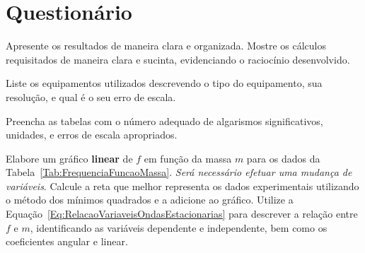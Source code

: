 \begin{fullwidth}
\noindent{}
\vspace{5mm}

\noindent{}

\noindent{}

\noindent{}

\noindent{}

\noindent{}
\end{fullwidth}

\vspace{5mm}

\section{Questionário}

\begin{question}[type={exam}]{1}
Apresente os resultados de maneira clara e organizada. Mostre os cálculos requisitados de maneira clara e sucinta, evidenciando o raciocínio desenvolvido.
\end{question}

\begin{question}[type={exam}]{0.75}
Liste os equipamentos utilizados descrevendo o tipo do equipamento, sua resolução, e qual é o seu erro de escala.
\end{question}

\begin{question}[type={exam}]{0.75}
Preencha as tabelas com o número adequado de algarismos significativos, unidades, e erros de escala apropriados. 
\end{question}

\begin{question}[type={exam}]{1}
Elabore um gráfico \textbf{linear} de $f$ em função da massa $m$ para os dados da Tabela~\ref{Tab:FrequenciaFuncaoMassa}. \emph{Será necessário efetuar uma mudança de variáveis}. Calcule a reta que melhor representa os dados experimentais utilizando o método dos mínimos quadrados e a adicione ao gráfico. Utilize a Equação~\eqref{Eq:RelacaoVariaveisOndasEstacionarias} para descrever a relação entre $f$ e $m$, identificando as variáveis dependente e independente, bem como os coeficientes angular e linear.
\end{question}

